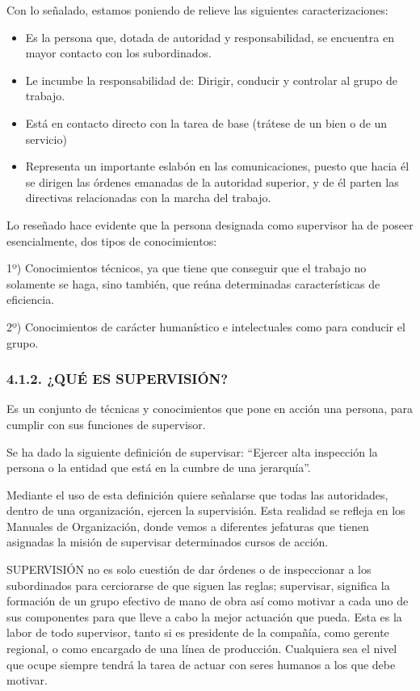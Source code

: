 Con lo señalado, estamos poniendo de relieve las siguientes caracterizaciones:

\begin{itemize}
  \item Es la persona que, dotada de autoridad y responsabilidad, se encuentra en mayor contacto con los subordinados.
  \item Le incumbe la responsabilidad de: Dirigir, conducir y controlar al grupo de trabajo.
  \item Está en contacto directo con la tarea de base (trátese de un bien o de un servicio)
  \item Representa un importante eslabón en las comunicaciones, puesto que hacia él se dirigen las órdenes emanadas de la autoridad superior, y de él parten las directivas relacionadas con la marcha del trabajo.
\end{itemize}
Lo reseñado hace evidente que la persona designada como supervisor ha de poseer esencialmente, dos tipos de conocimientos:

1º) Conocimientos técnicos, ya que tiene que conseguir que el trabajo no solamente se haga, sino también, que reúna determinadas características de eficiencia.

2º) Conocimientos de carácter humanístico e intelectuales como para conducir el grupo.

\subsubsection*{4.1.2. ¿QUÉ ES SUPERVISIÓN?}
Es un conjunto de técnicas y conocimientos que pone en acción una persona, para cumplir con sus funciones de supervisor.

Se ha dado la siguiente definición de supervisar: “Ejercer alta inspección la persona o la entidad que está en la cumbre de una jerarquía”.



Mediante el uso de esta definición quiere señalarse que todas las autoridades, dentro de una organización, ejercen la supervisión. Esta realidad se refleja en los Manuales de Organización, donde vemos a diferentes jefaturas que tienen asignadas la misión de supervisar determinados cursos de acción.

SUPERVISIÓN no es solo cuestión de dar órdenes o de inspeccionar a los subordinados para cerciorarse de que siguen las reglas; supervisar, significa la formación de un grupo efectivo de mano de obra así como motivar a cada uno de sus componentes para que lleve a cabo la mejor actuación que pueda. Esta es la labor de todo supervisor, tanto si es presidente de la compañía, como gerente regional, o como encargado de una línea de producción. Cualquiera sea el nivel que ocupe siempre tendrá la tarea de actuar con seres humanos a los que debe motivar.

